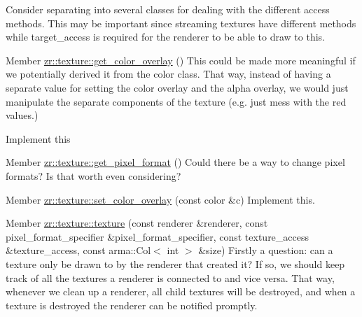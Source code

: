 \begin{DoxyRefList}
Consider separating into several classes for dealing with the different access methods. This may be important since streaming textures have different methods while target\+\_\+access is required for the renderer to be able to draw to this.  
\item[Member \mbox{\hyperlink{classzr_1_1texture_a6b1635827466882d2321a3e069fed0b4}{zr\+::texture\+::get\+\_\+color\+\_\+overlay}} ()]\label{todo__todo000014}%
%
This could be made more meaningful if we potentially derived it from the color class. That way, instead of having a separate value for setting the color overlay and the alpha overlay, we would just manipulate the separate components of the texture (e.\+g. just mess with the red values.)

\label{todo__todo000015}%
%
Implement this  
\item[Member \mbox{\hyperlink{classzr_1_1texture_aee8c0582b3f93304a66faecbd7c508a5}{zr\+::texture\+::get\+\_\+pixel\+\_\+format}} ()]\label{todo__todo000017}%
%
Could there be a way to change pixel formats? Is that worth even considering? 
\item[Member \mbox{\hyperlink{classzr_1_1texture_a4e8b4e61c04447d3a94979e83a010927}{zr\+::texture\+::set\+\_\+color\+\_\+overlay}} (const color \&c)]\label{todo__todo000016}%
%
Implement this. 
\item[Member \mbox{\hyperlink{classzr_1_1texture_a90bc21e25a2889400253763294280924}{zr\+::texture\+::texture}} (const renderer \&renderer, const pixel\+\_\+format\+\_\+specifier \&pixel\+\_\+format\+\_\+specifier, const texture\+\_\+access \&texture\+\_\+access, const arma\+::\+Col$<$ int $>$ \&size)]\label{todo__todo000013}%
%
Firstly a question\+: can a texture only be drawn to by the renderer that created it? If so, we should keep track of all the textures a renderer is connected to and vice versa. That way, whenever we clean up a renderer, all child textures will be destroyed, and when a texture is destroyed the renderer can be notified promptly.
\end{DoxyRefList}